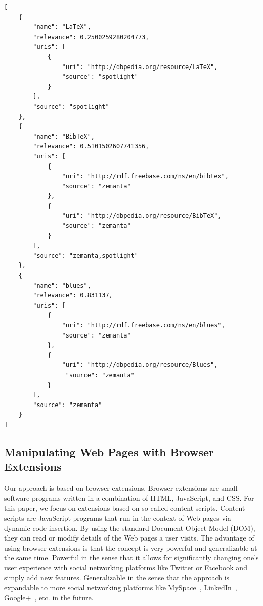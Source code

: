 \documentclass{iosart2c}
\begin{document}
\begin{lstlisting}[caption={Named entity disambiguation wrapper API output in JSON form for the micropost \textit{``Tom has the LaTeX, BibTeX, LaTeX, LaTeX blues...''}.},label={lst:nlpjson}]
[
    {
        "name": "LaTeX",
        "relevance": 0.2500259280204773,
        "uris": [
            {
                "uri": "http://dbpedia.org/resource/LaTeX",
                "source": "spotlight"
            }
        ],
        "source": "spotlight"
    },
    {
        "name": "BibTeX",
        "relevance": 0.5101502607741356,
        "uris": [
            {
                "uri": "http://rdf.freebase.com/ns/en/bibtex",
                "source": "zemanta"
            },
            {
                "uri": "http://dbpedia.org/resource/BibTeX",
                "source": "zemanta"
            }
        ],
        "source": "zemanta,spotlight"
    },
    {
        "name": "blues",
        "relevance": 0.831137,
        "uris": [
            {
                "uri": "http://rdf.freebase.com/ns/en/blues",
                "source": "zemanta"
            },
            {
                "uri": "http://dbpedia.org/resource/Blues",
                 "source": "zemanta"
            }
        ],
        "source": "zemanta"
    }    
]
\end{lstlisting}

\subsection{Manipulating Web Pages with Browser Extensions}
Our approach is based on browser extensions.
Browser extensions are small software programs written in a combination of HTML, JavaScript, and CSS.
For this paper, we focus on extensions based on so-called content scripts.
Content scripts are JavaScript programs that run in the context of Web pages via dynamic code insertion.
By using the standard Document Object Model (DOM), they can read or modify details of the Web pages a user visits.
The advantage of using browser extensions is that the concept is very powerful and generalizable at the same time.
Powerful in the sense that it allows for significantly changing one's user experience with social networking platforms like Twitter or Facebook and simply add new features.
Generalizable in the sense that the approach is expandable to more social networking platforms like MySpace~\cite{MySpace}, LinkedIn~\cite{LinkedIn}, Google+~\cite{GooglePlus}, etc. in the future.
\end{document}
